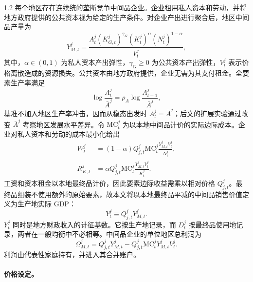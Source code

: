\documentclass[12pt,UTF8]{ctexart}
\newcommand{\MC}{\mathrm{MC}}
\begin{document}
\begin{spacing}{1.2}
		每个地区存在连续统的垄断竞争中间品企业。企业租用私人资本和劳动，并将地方政府提供的公共资本视为给定的生产条件。对企业产出进行聚合后，地区中间品产量为
		\begin{equation}
			Y_{M,t}^j=\frac{A_t^j(K_{G,t}^j)^{\gamma_G}(K_t^j)^{\alpha}(N_t^j)^{1-\alpha}}{V_t^j},
			\label{eq:intermediate_production}
		\end{equation}
		其中，$\alpha\in(0,1)$ 为私人资本产出弹性，$\gamma_G\geq0$ 为公共资本产出弹性，$V_t^j$ 表示价格离散造成的资源损失。公共资本由地方政府提供，企业无需为其支付租金。全要素生产率满足
		\begin{equation}
			\log\frac{A_t^j}{\bar A^j}=\rho_A\log\frac{A_{t-1}^j}{\bar A^j},
			\label{eq:tfp_process}
		\end{equation}
		基准不加入地区生产率冲击，因而从稳态出发时 $A_t^j=\bar A^j$；后文的扩展实验通过改变 $\bar A^j$ 考察地区发展水平差异。令 $\MC_t^j$ 为以本地中间品计价的实际边际成本。企业对私人资本和劳动的成本最小化给出
		\begin{align}
			W_t^j &=(1-\alpha)Q_{j,t}^j\MC_t^j\frac{Y_{M,t}^jV_t^j}{N_t^j}, \label{eq:wage_demand}\\
			R_{K,t}^j &=\alpha Q_{j,t}^j\MC_t^j\frac{Y_{M,t}^jV_t^j}{K_t^j}.
			\label{eq:rk_demand}
		\end{align}
		工资和资本租金以本地最终品计价，因此要素边际收益需乘以相对价格 $Q_{j,t}^j$。最终品组装不使用额外的原始要素，故本文将以本地最终品平减的中间品销售价值定义为生产地实际 GDP：
		\begin{equation}
			Y_t^j\equiv Q_{j,t}^jY_{M,t}^j.
			\label{eq:local_gdp}
		\end{equation}
		$Y_t^j$ 同时是地方财政收入的计征基数。它按生产地记录，而 $D_t^j$ 按最终品使用地记录，两者在一般均衡中不必相等。中间品企业的单位地区总利润为
		\begin{equation}
			\Omega_{M,t}^j=Q_{j,t}^jY_{M,t}^j-Q_{j,t}^j\MC_t^jY_{M,t}^jV_t^j.
			\label{eq:firm_profit}
		\end{equation}
		利润由代表性家庭持有，并进入其合并账户。
		
		\paragraph{价格设定。}
		

\end{spacing}
\end{document}
